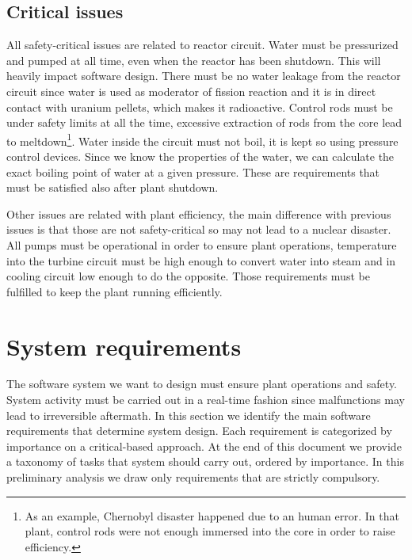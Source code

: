 \documentclass[10pt,a4paper]{report}
\begin{document}
\subsection{Critical issues}
All safety-critical issues are related to reactor circuit. Water must be 
pressurized and pumped at all time, even when the reactor has been shutdown.
This will heavily impact software design. There must be no water leakage from the
reactor circuit since water is used as moderator of fission reaction and it 
is in direct contact with uranium pellets, which makes it radioactive. Control 
rods must be under safety limits at all the time, excessive extraction of rods 
from the core lead to meltdown\footnote{
    As an example, Chernobyl disaster happened due to
    an human error. In that plant, control rods were not enough immersed into the
    core in order to raise efficiency.
}. Water inside the circuit must not boil, it is kept so using pressure control
devices. Since we know the properties of the water, we can calculate the exact 
boiling point of water at a given pressure. These are requirements that must be 
satisfied also after plant shutdown. 

Other issues are related with plant efficiency, the main difference with previous
issues is that those are not safety-critical so may not lead to a nuclear disaster.
All pumps must be operational in order to ensure plant operations, temperature
into the turbine circuit must be high enough to convert water into steam and
in cooling circuit low enough to do the opposite. Those requirements must be 
fulfilled to keep the plant running efficiently. 

\section{System requirements}
The software system we want to design must ensure plant operations and safety. 
System activity must be carried out in a real-time fashion since malfunctions 
may lead to irreversible aftermath. In this section we identify the main software 
requirements that determine system design. Each requirement is categorized by 
importance on a critical-based approach. At the end of this document we provide
a taxonomy of tasks that system should carry out, ordered by importance. In 
this preliminary analysis we draw only requirements that are strictly compulsory.
\end{document}
